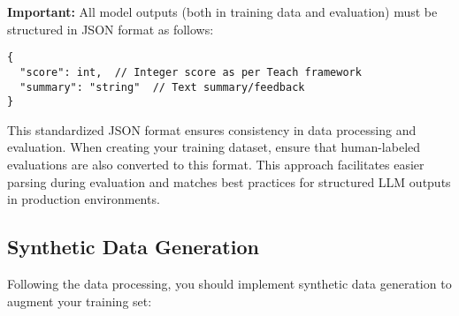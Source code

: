 \documentclass[11pt]{article}
\begin{document}
\textbf{Important:} All model outputs (both in training data and evaluation) must be structured in JSON format as follows:

\begin{verbatim}
{
  "score": int,  // Integer score as per Teach framework
  "summary": "string"  // Text summary/feedback
}
\end{verbatim}

This standardized JSON format ensures consistency in data processing and evaluation. When creating your training dataset, ensure that human-labeled evaluations are also converted to this format. This approach facilitates easier parsing during evaluation and matches best practices for structured LLM outputs in production environments.

\subsection{Synthetic Data Generation}

Following the data processing, you should implement synthetic data generation to augment your training set:
\end{document}
